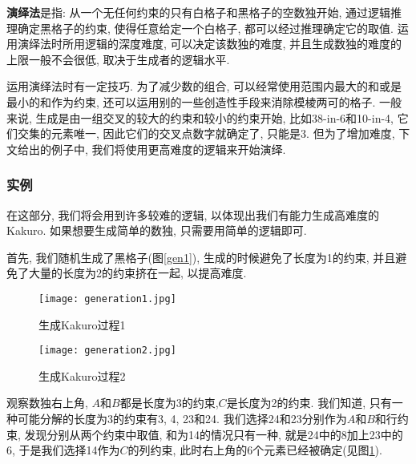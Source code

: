             \textbf{演绎法}是指: 从一个无任何约束的只有白格子和黑格子的空数独开始,
            通过逻辑推理确定黑格子的约束, 使得任意给定一个白格子, 都可以经过推理确定它的取值.
            运用演绎法时所用逻辑的深度难度, 可以决定该数独的难度,
            并且生成数独的难度的上限一般不会很低, 取决于生成者的逻辑水平.

            运用演绎法时有一定技巧. 为了减少数的组合,
            可以经常使用范围内最大的和或是最小的和作为约束,
            还可以运用别的一些创造性手段来消除模棱两可的格子.
            一般来说, 生成是由一组交叉的较大的约束和较小的约束开始,
            比如38-in-6和10-in-4, 它们交集的元素唯一, 因此它们的交叉点数字就确定了, 只能是3.
            但为了增加难度, 下文给出的例子中, 我们将使用更高难度的逻辑来开始演绎.

        \subsubsection{实例}
            在这部分, 我们将会用到许多较难的逻辑, 以体现出我们有能力生成高难度的Kakuro.
            如果想要生成简单的数独, 只需要用简单的逻辑即可.

            首先, 我们随机生成了黑格子(图\ref{gen1}), 生成的时候避免了长度为1的约束,
            并且避免了大量的长度为2的约束挤在一起, 以提高难度.

            \begin{figure}[htb]
                \begin{minipage}[t]{0.49\linewidth}
                    \centering
                    \texttt{[image: generation1.jpg]}
                    \caption[生成1]{生成Kakuro过程1}\label{gen1}
                \end{minipage}
                \begin{minipage}[t]{0.49\linewidth}
                    \centering
                    \texttt{[image: generation2.jpg]}
                    \caption[生成2]{生成Kakuro过程2}\label{gen2}
                \end{minipage}
            \end{figure}

            观察数独右上角, $A$和$B$都是长度为3的约束,$C$是长度为2的约束.
            我们知道, 只有一种可能分解的长度为3的约束有3, 4, 23和24.
            我们选择24和23分别作为$A$和$B$和行约束,
            发现分别从两个约束中取值, 和为14的情况只有一种, 就是24中的8加上23中的6,
            于是我们选择14作为$C$的列约束, 此时右上角的6个元素已经被确定(见图\ref{gen2}).

